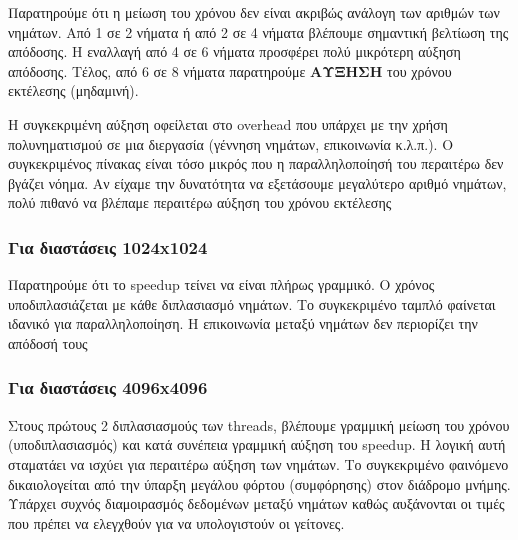 \documentclass[../final_report.tex]{subfiles}
\begin{document}
Παρατηρούμε ότι η μείωση του χρόνου δεν είναι ακριβώς ανάλογη των αριθμών των νημάτων. Από 1 σε 2 νήματα ή από 2 σε 4 νήματα βλέπουμε σημαντική βελτίωση της απόδοσης. Η εναλλαγή από 4 σε 6 νήματα προσφέρει πολύ μικρότερη αύξηση απόδοσης. Τέλος, από 6 σε 8 νήματα παρατηρούμε \textbf{ΑΥΞΗΣΗ} του χρόνου εκτέλεσης (μηδαμινή). 

Η συγκεκριμένη αύξηση οφείλεται στο overhead που υπάρχει με την χρήση πολυνηματισμού σε μια διεργασία (γέννηση νημάτων, επικοινωνία κ.λ.π.). Ο συγκεκριμένος πίνακας είναι τόσο μικρός που η παραλληλοποίησή του περαιτέρω δεν βγάζει νόημα. Αν είχαμε την δυνατότητα να εξετάσουμε μεγαλύτερο αριθμό νημάτων, πολύ πιθανό να βλέπαμε περαιτέρω αύξηση του χρόνου εκτέλεσης
\subsubsection*{Για διαστάσεις 1024x1024}

Παρατηρούμε ότι το speedup τείνει να είναι πλήρως γραμμικό. Ο χρόνος υποδιπλασιάζεται με κάθε διπλασιασμό νημάτων. Το συγκεκριμένο ταμπλό φαίνεται ιδανικό για παραλληλοποίηση. Η επικοινωνία μεταξύ νημάτων δεν περιορίζει την απόδοσή τους
\subsubsection*{Για διαστάσεις 4096x4096}

Στους πρώτους 2 διπλασιασμούς των threads, βλέπουμε γραμμική μείωση του χρόνου (υποδιπλασιασμός) και κατά συνέπεια γραμμική αύξηση του speedup. Η λογική αυτή σταματάει να ισχύει για περαιτέρω αύξηση των νημάτων. Το συγκεκριμένο φαινόμενο δικαιολογείται από την ύπαρξη μεγάλου φόρτου (συμφόρησης) στον διάδρομο μνήμης. Υπάρχει συχνός διαμοιρασμός δεδομένων μεταξύ νημάτων καθώς αυξάνονται οι τιμές που πρέπει να ελεγχθούν για να υπολογιστούν οι γείτονες.
\end{document}
